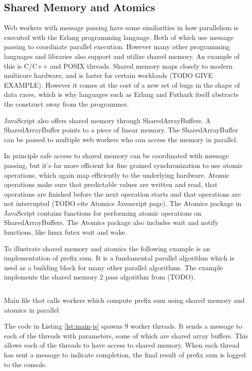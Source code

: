 \documentclass[11pt]{article}
\begin{document}
\subsection{Shared Memory and Atomics}

Web workers with message passing have some similarities in how parallelism is executed with the Erlang programming language. Both of which use message passing to coordinate parallel execution. However many other programming languages and libraries also support and utilize shared memory. An example of this is C/C++ and POSIX threads. Shared memory maps closely to modern multicore hardware, and is faster for certain workloads (TODO GIVE EXAMPLE). However it comes at the cost of a new set of bugs in the shape of data races, which is why languages such as Erlang and Futhark itself abstracts the construct away from the programmer.


JavaScript also offers shared memory through SharedArrayBuffers. A SharedArrayBuffer points to a piece of linear memory. The SharedArrayBuffer can be passed to multiple web workers who can access the memory in parallel. 

In principle safe access to shared memory can be coordinated with message passing, but it's far more efficient for fine grained synchronization to use atomic operations, which again map efficiently to the underlying hardware. Atomic operations make sure that predictable values are written and read, that operations are finished before the next operation starts and that operations are not interrupted (TODO cite Atomics Javascript page). The Atomics package in JavaScript contains functions for performing atomic operations on SharedArrayBuffers. The Atomics package also includes wait and notify functions, like linux futex wait and wake.

To illustrate shared memory and atomics the following example is an implementation of prefix sum. It is a fundamental parallel algorithm which is used as a building block for many other parallel algorithms. The example implements the shared memory 2 pass algorithm from (TODO). 
\begin{listing}[H]    
        \inputminted[fontsize=\small,baselinestretch=0.5,linenos]{javascript}{code/shared/main.js}
        \caption{Main file that calls workers which compute prefix sum using shared memory and atomics in parallel}    
        \label{lst:main-js}    
\end{listing}    

The code in Listing \ref{lst:main-js} spawns 9 worker threads. It sends a message to each of the threads with parameters, some of which are shared array buffers. This allows each of the threads to have access to shared memory. When each thread has sent a message to indicate completion, the final result of prefix sum is logged to the console.
\end{document}
